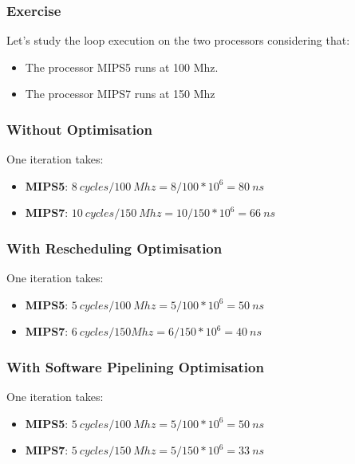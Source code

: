 
\begin{frame}
  \frametitle{Exercise}

  Let's study the loop execution on the two processors considering that:

  \begin{itemize}
    \item
      The processor MIPS5 runs at 100 Mhz.
    \item
      The processor MIPS7 runs at 150 Mhz
  \end{itemize}
\end{frame}


\begin{frame}
  \frametitle{Without Optimisation}

  One iteration takes:

  \begin{itemize}
    \item
      \textbf{MIPS5}: $8~cycles / 100~Mhz = 8 / 100 * 10^{6} = 80~ns$
    \item
      \textbf{MIPS7}: $10~cycles / 150~Mhz = 10 / 150 * 10^{6} = 66~ns$
  \end{itemize}
\end{frame}


\begin{frame}
  \frametitle{With Rescheduling Optimisation}

  One iteration takes:

  \begin{itemize}
    \item
      \textbf{MIPS5}: $5~cycles / 100~Mhz = 5 / 100 * 10^{6} = 50~ns$
    \item
      \textbf{MIPS7}: $6~cycles / 150 Mhz = 6 / 150 * 10^{6} = 40~ns$
  \end{itemize}
\end{frame}


\begin{frame}
  \frametitle{With Software Pipelining Optimisation}

  One iteration takes:

  \begin{itemize}
    \item
      \textbf{MIPS5}: $5~cycles / 100~Mhz = 5 / 100 * 10^{6} = 50~ns$
    \item
      \textbf{MIPS7}: $5~cycles / 150~Mhz = 5 / 150 * 10^{6} = 33~ns$
  \end{itemize}
\end{frame}

